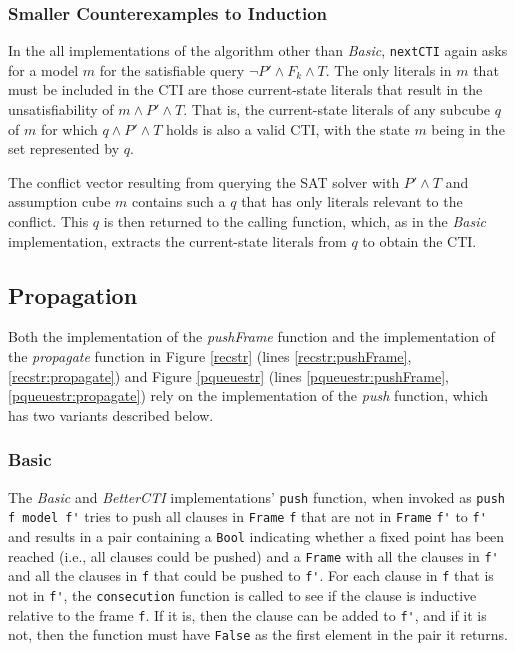\documentclass[12pt,a4paper,twoside,openright]{report}
\begin{document}
{\subsubsection{Smaller Counterexamples to Induction}
In the all implementations of the algorithm other than {\it Basic},
\verb,nextCTI, again asks for a model $m$
for the satisfiable query $\neg P' \wedge F_k \wedge T$. The only literals in $m$ that
must be included in the CTI are those current-state literals that result in
the unsatisfiability of $m \wedge P' \wedge T$. That is, the current-state literals of any
subcube $q$ of $m$ for which $q \wedge P' \wedge T$ holds is also a valid CTI, with
the state $m$ being in the set represented by $q$.

The conflict vector resulting from querying the SAT solver with $P' \wedge T$ and assumption
cube $m$ contains such a $q$ that has only literals relevant to the conflict. This $q$ is
then returned to the calling function, which, as in the \emph{Basic} implementation, extracts
the current-state literals from $q$ to obtain the CTI.


\subsection{Propagation}

Both the implementation of the {\it pushFrame} function and the implementation of the
{\it propagate} function in Figure \ref{recstr} (lines \ref{recstr:pushFrame},
\ref{recstr:propagate}) and
Figure \ref{pqueuestr} (lines \ref{pqueuestr:pushFrame}, \ref{pqueuestr:propagate})
rely on the implementation of the
{\it push} function, which has two variants described below.

\subsubsection{Basic}
The {\it Basic} and {\it BetterCTI} implementations' \verb,push, function,
when invoked as \verb,push f model f', tries to push all clauses in \verb,Frame, \verb,f,
that are not in \verb,Frame, \verb,f', to \verb,f', and
results in a pair containing a \verb,Bool, indicating whether a fixed point has been reached
(i.e., all clauses could be pushed) and a \verb,Frame, with all the clauses in \verb,f', and all
the clauses in \verb,f, that could be pushed to \verb,f',.
For each clause in \verb,f, that is not in \verb,f',, the \verb,consecution, function is called to
see if the clause is inductive relative to the frame \verb,f,. If it is, then
the clause can be added to \verb,f',, and if it is not, then the
function must have \verb,False, as the first element in the pair it returns.

}
\end{document}
